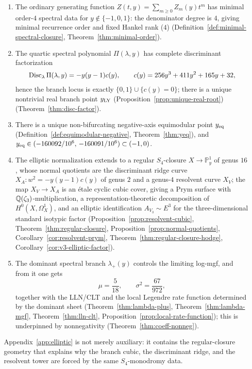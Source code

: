 \begin{enumerate}
  \item
  The ordinary generating function \(Z(t,y)=\sum_{m\ge0}Z_m(y)t^m\) has minimal order-\(4\) spectral data for \(y\notin\{-1,0,1\}\): the denominator degree is \(4\), giving minimal recurrence order and fixed Hankel rank (\(4\)) (Definition~\ref{def:minimal-spectral-closure}, Theorem~\ref{thm:minimal-order}).
  \item
  The quartic spectral polynomial \(\Pi(\lambda,y)\) has complete discriminant factorization
  \[
  \operatorname{Disc}_\lambda \Pi(\lambda,y)=-y(y-1)c(y),\qquad c(y)=256y^3+411y^2+165y+32,
  \]
  hence the branch locus is exactly \(\{0,1\}\cup\{c(y)=0\}\); there is a unique nontrivial real branch point \(y_{\mathrm{LY}}\) (Proposition~\ref{prop:unique-real-root}) (Theorem~\ref{thm:disc-factor}).
  \item
  There is a unique non-bifurcating negative-axis equimodular point \(y_{\mathrm{eq}}\) (Definition~\ref{def:equimodular-negative}, Theorem~\ref{thm:yeq}), and
  \(y_{\mathrm{eq}}\in(-160092/10^6,\,-160091/10^6)\subset(-1,0)\).
  \item
  The elliptic normalization extends to a regular \(S_4\)-closure \(X\to\mathbb{P}^1_y\) of genus \(16\), whose normal quotients are the discriminant ridge curve \(X_A:w^2=-y(y-1)c(y)\) of genus \(2\) and a genus-\(4\) resolvent curve \(X_V\); the map \(X_V\to X_A\) is an \'etale cyclic cubic cover, giving a Prym surface with \(\mathbb{Q}(\zeta_3)\)-multiplication, a representation-theoretic decomposition of \(H^0(X,\Omega_X^1)\), and an elliptic identification \(A_{V_3}\sim E^3\) for the three-dimensional standard isotypic factor (Proposition~\ref{prop:resolvent-cubic}, Theorem~\ref{thm:regular-closure}, Proposition~\ref{prop:normal-quotients}, Corollary~\ref{cor:resolvent-prym}, Theorem~\ref{thm:regular-closure-hodge}, Corollary~\ref{cor:v3-elliptic-factor}).
  \item
  The dominant spectral branch \(\lambda_+(y)\) controls the limiting log-mgf, and from it one gets
  \[
  \mu=\frac{5}{18},\qquad \sigma^2=\frac{67}{972},
  \]
  together with the LLN/CLT and the local Legendre rate function determined by the dominant sheet (Theorem~\ref{thm:lambda-plus}, Theorem~\ref{thm:lambda-mgf}, Theorem~\ref{thm:lln-clt}, Proposition~\ref{prop:local-rate-function}); this is underpinned by nonnegativity (Theorem~\ref{thm:coeff-nonneg}).
\end{enumerate}

Appendix~\ref{app:elliptic} is not merely auxiliary: it contains the regular-closure geometry that explains why the branch cubic, the discriminant ridge, and the resolvent tower are forced by the same \(S_4\)-monodromy data.

